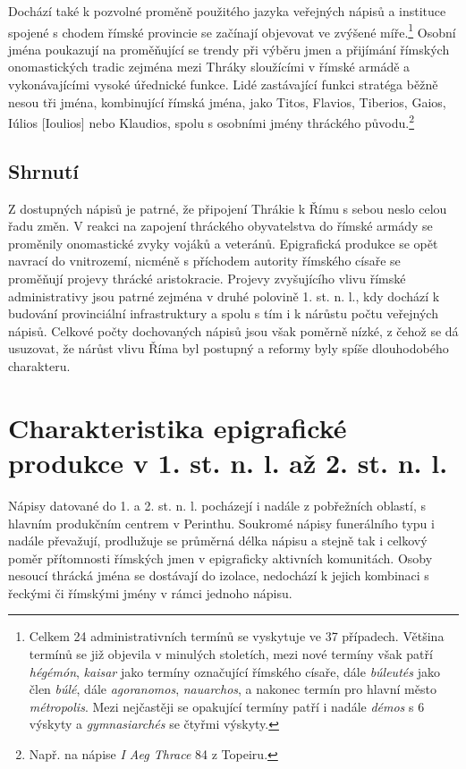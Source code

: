 Dochází také k pozvolné proměně použitého jazyka veřejných nápisů a instituce spojené s chodem římské provincie se začínají objevovat ve zvýšené míře.\footnote{Celkem 24 administrativních termínů se vyskytuje ve 37 případech. Většina termínů se již objevila v minulých stoletích, mezi nové termíny však patří {\em hégémón}, {\em kaisar} jako termíny označující římského císaře, dále {\em búleutés} jako člen {\em búlé}, dále {\em agoranomos}, {\em nauarchos}, a nakonec termín pro hlavní město {\em métropolis}. Mezi nejčastěji se opakující termíny patří i nadále {\em démos} s 6 výskyty a {\em gymnasiarchés} se čtyřmi výskyty.} Osobní jména poukazují na proměňující se trendy při výběru jmen a přijímání římských onomastických tradic zejména mezi Thráky sloužícími v římské armádě a vykonávajícími vysoké úřednické funkce. Lidé zastávající funkci stratéga běžně nesou tři jména, kombinující římská jména, jako Titos, Flavios, Tiberios, Gaios, Iúlios {[}Ioulios{]} nebo Klaudios, spolu s osobními jmény thráckého původu.\footnote{Např. na nápise {\em I Aeg Thrace} 84 z Topeiru.}

\subsection[shrnutí-15]{Shrnutí}

Z dostupných nápisů je patrné, že připojení Thrákie k Římu s sebou neslo celou řadu změn. V reakci na zapojení thráckého obyvatelstva do římské armády se proměnily onomastické zvyky vojáků a veteránů. Epigrafická produkce se opět navrací do vnitrozemí, nicméně s příchodem autority římského císaře se proměňují projevy thrácké aristokracie. Projevy zvyšujícího vlivu římské administrativy jsou patrné zejména v druhé polovině 1. st. n. l., kdy dochází k budování provinciální infrastruktury a spolu s tím i k nárůstu počtu veřejných nápisů. Celkové počty dochovaných nápisů jsou však poměrně nízké, z čehož se dá usuzovat, že nárůst vlivu Říma byl postupný a reformy byly spíše dlouhodobého charakteru.

\section[charakteristika-epigrafické-produkce-v-1.-st.-n.-l.-až-2.-st.-n.-l.]{Charakteristika epigrafické produkce v 1. st. n. l. až 2. st. n. l.}

Nápisy datované do 1. a 2. st. n. l. pocházejí i nadále z pobřežních oblastí, s hlavním produkčním centrem v Perinthu. Soukromé nápisy funerálního typu i nadále převažují, prodlužuje se průměrná délka nápisu a stejně tak i celkový poměr přítomnosti římských jmen v epigraficky aktivních komunitách. Osoby nesoucí thrácká jména se dostávají do izolace, nedochází k jejich kombinaci s řeckými či římskými jmény v rámci jednoho nápisu.

